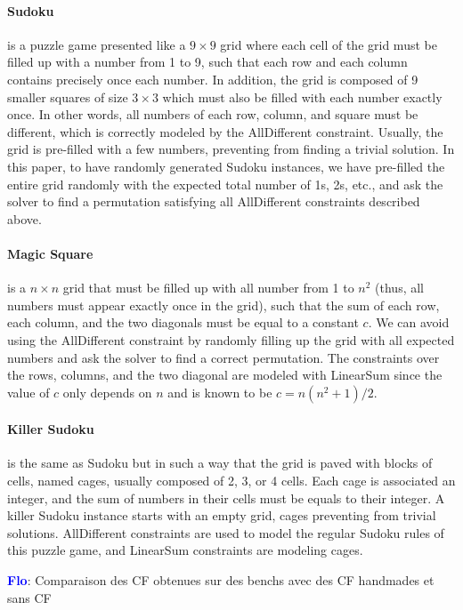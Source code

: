 \documentclass{article}
\newcommand{\flo}{\textcolor{blue}{\bf Flo}\xspace}
\begin{document}
\paragraph{Sudoku} is a puzzle game presented like a $9 \times 9$ grid where each cell of the grid must be filled up with a number from 1 to 9,  such that each row and each column contains precisely once each number. In addition, the grid is composed of 9 smaller squares of size $3  \times 3$  which must also be filled with each number exactly once. In other words, all numbers of each row, column, and square must be different,   which is correctly modeled by the  AllDifferent constraint.   Usually, the grid is pre-filled with a few numbers, preventing from finding a trivial solution.  In this paper,  to have randomly generated Sudoku instances, we have pre-filled the entire grid randomly with the expected total number of 1s, 2s, etc., and ask the solver to find a  permutation satisfying all  AllDifferent constraints described above.

\paragraph{Magic Square} is a $n \times n$ grid that must be filled up with all number from 1 to $n^2$ (thus, all numbers must appear exactly once in the grid), such that the sum of each row, each column, and the two diagonals must be equal to a constant $c$.  We can avoid using the AllDifferent constraint by randomly filling up the grid with all expected numbers and ask the solver to find a correct permutation. The constraints over the rows, columns, and the two diagonal are modeled with LinearSum since the value of  $c$ only depends on $n$  and is known to be $c = n(n^2 + 1)/2$.

\paragraph{Killer Sudoku}  is the same as Sudoku but in such a way that the grid is paved with blocks of cells, named cages, usually composed of 2, 3, or 4 cells.  Each cage is associated an integer, and the sum  of numbers in their cells must be equals to their integer. A  killer Sudoku instance starts with an empty grid, cages preventing from trivial solutions. AllDifferent constraints are used to model the regular Sudoku rules of this puzzle game, and LinearSum constraints are modeling cages.

\flo: Comparaison des  CF obtenues sur des  benchs avec des CF  handmades et
sans CF
\end{document}

